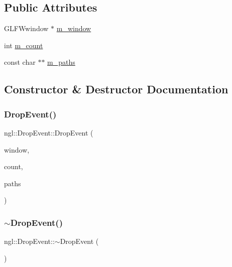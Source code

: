 \subsection*{Public Attributes}
\begin{DoxyCompactItemize}
\item 
G\+L\+F\+Wwindow $\ast$ \mbox{\hyperlink{structngl_1_1_drop_event_ae5e6f8535a64a8d97e3c479c81be0548}{m\+\_\+window}}
\item 
int \mbox{\hyperlink{structngl_1_1_drop_event_a164af5204bf34707a2de08f5e677b8e6}{m\+\_\+count}}
\item 
const char $\ast$$\ast$ \mbox{\hyperlink{structngl_1_1_drop_event_af2d049788f4ae4d13fbad7fa858fbe08}{m\+\_\+paths}}
\end{DoxyCompactItemize}


\subsection{Constructor \& Destructor Documentation}
\mbox{\label{structngl_1_1_drop_event_ab62f900b8a1178a69962a34495b67aba}} 
\subsubsection{\texorpdfstring{Drop\+Event()}{DropEvent()}}
{\footnotesize\ttfamily ngl\+::\+Drop\+Event\+::\+Drop\+Event (\begin{DoxyParamCaption}\item[{G\+L\+F\+Wwindow $\ast$}]{window,  }\item[{const int}]{count,  }\item[{const char $\ast$$\ast$}]{paths }\end{DoxyParamCaption})}

\mbox{\label{structngl_1_1_drop_event_a36815d916c0efc4f1958631804131763}} 
\subsubsection{\texorpdfstring{$\sim$\+Drop\+Event()}{~DropEvent()}}
{\footnotesize\ttfamily ngl\+::\+Drop\+Event\+::$\sim$\+Drop\+Event (\begin{DoxyParamCaption}{ }\end{DoxyParamCaption})}



